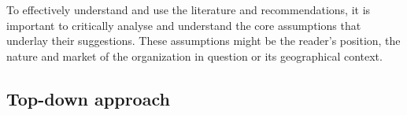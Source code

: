 \documentclass[a4]{scrartcl}
\begin{document}
To effectively understand and use the literature and recommendations, it is important to critically analyse and understand the core assumptions that underlay their suggestions.
These assumptions might be the reader's position, the nature and market of the organization in question or its geographical context. 







	



\subsection{Top-down approach} \label{subsec:topdown}
\end{document}
